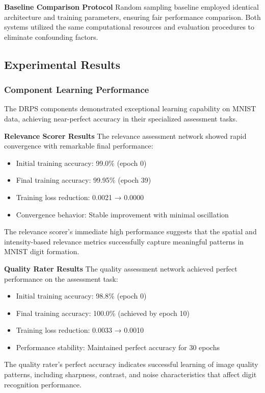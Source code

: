 \documentclass[12pt]{article}
\begin{document}
\textbf{Baseline Comparison Protocol}
Random sampling baseline employed identical architecture and training parameters, ensuring fair performance comparison. Both systems utilized the same computational resources and evaluation procedures to eliminate confounding factors.

\subsection{Experimental Results}\label{results}

\subsubsection{Component Learning Performance}\label{component-performance}

The DRPS components demonstrated exceptional learning capability on MNIST data, achieving near-perfect accuracy in their specialized assessment tasks.

\textbf{Relevance Scorer Results}
The relevance assessment network showed rapid convergence with remarkable final performance:
\begin{itemize}
\item Initial training accuracy: 99.0\% (epoch 0)
\item Final training accuracy: 99.95\% (epoch 39)
\item Training loss reduction: 0.0021 → 0.0000
\item Convergence behavior: Stable improvement with minimal oscillation
\end{itemize}

The relevance scorer's immediate high performance suggests that the spatial and intensity-based relevance metrics successfully capture meaningful patterns in MNIST digit formation.

\textbf{Quality Rater Results}
The quality assessment network achieved perfect performance on the assessment task:
\begin{itemize}
\item Initial training accuracy: 98.8\% (epoch 0)
\item Final training accuracy: 100.0\% (achieved by epoch 10)
\item Training loss reduction: 0.0033 → 0.0010
\item Performance stability: Maintained perfect accuracy for 30 epochs
\end{itemize}

The quality rater's perfect accuracy indicates successful learning of image quality patterns, including sharpness, contrast, and noise characteristics that affect digit recognition performance.
\end{document}
